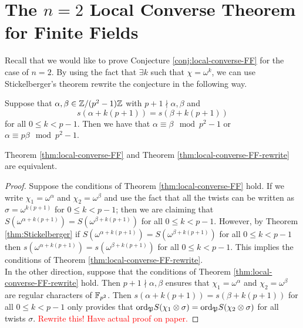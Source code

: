 \section{The $n=2$ Local Converse Theorem for Finite Fields}
Recall that we would like to prove Conjecture \ref{conj:local-converse-FF} for the case of $n=2$.
By using the fact that $\exists k$ such that $\chi = \omega^k$, we can use Stickelberger's theorem rewrite the conjecture in the following way.

\begin{theorem}\label{thm:local-converse-FF-rewrite}
Suppose that $\alpha, \beta \in \mathbb{Z}/(p^2 -1)\mathbb{Z}$ with $p+1 \nmid \alpha, \beta$ and \[s(\alpha + k(p+1)) = s(\beta + k(p+1))\] for all $0 \leq k < p-1$. Then we have that $\alpha \equiv \beta \mod p^2 - 1$ or $\alpha \equiv p \beta \mod p^2 -1$.
\end{theorem}

\begin{prop}
Theorem \ref{thm:local-converse-FF} and Theorem \ref{thm:local-converse-FF-rewrite} are equivalent.
\end{prop}

\begin{proof}
Suppose the conditions of Theorem \ref{thm:local-converse-FF} hold. 
If we write $\chi_1 = \omega^\alpha$ and $\chi_2 = \omega^\beta$ and use the fact that all the twists can be written as $\sigma = \omega^{k (p+1)}$ for $0 \leq k < p-1$; then we are claiming that $S(\omega^{\alpha + k(p+1)}) = S(\omega^{\beta+k(p+1)})$ for all $0 \leq k < p-1$. 
However, by Theorem \ref{thm:Stickelberger} if $S(\omega^{\alpha + k(p+1)}) = S(\omega^{\beta+k(p+1)})$ for all $0 \leq k < p-1$ then $s(\omega^{\alpha + k(p+1)}) = s(\omega^{\beta+k(p+1)})$ for all $0 \leq k < p-1$. 
This implies the conditions of Theorem \ref{thm:local-converse-FF-rewrite}.
\\

In the other direction, suppose that the conditions of Theorem \ref{thm:local-converse-FF-rewrite} hold. 
Then $p+1 \nmid \alpha, \beta$ ensures that $\chi_1 = \omega^\alpha$ and $\chi_2 = \omega^\beta$ are regular characters of $\mathbb{F}_{p^2}$. Then $s(\alpha + k(p+1)) = s(\beta + k(p+1))$ for all $0 \leq k < p-1$ only provides that $\textrm{ord}_{\mathfrak{P}} S(\chi_1 \otimes \sigma) = \textrm{ord}_{\mathfrak{P}} S(\chi_2 \otimes \sigma)$ for all twists $\sigma$. \textcolor{red}{Rewrite this! Have actual proof on paper.}

\end{proof}
\endinput